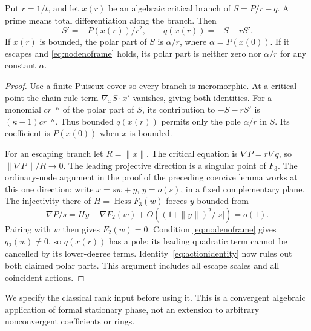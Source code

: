 \begin{lemma}\label{lem:actionidentity}
Put $r=1/t$, and let $x(r)$ be an algebraic critical branch of
$S=P/r-q$. A prime means total differentiation along the branch.
Then
\begin{equation}\label{eq:actionidentity}
 S'=-P(x(r))/r^2,\qquad q(x(r))=-S-rS'.
\end{equation}
If $x(r)$ is bounded, the polar part of $S$ is $\alpha/r$, where
$\alpha=P(x(0))$. If it escapes and \eqref{eq:nodenoframe} holds,
its polar part is neither zero nor $\alpha/r$ for any constant
$\alpha$.
\end{lemma}
\begin{proof}
Use a finite Puiseux cover so every branch is meromorphic. At a
critical point the chain-rule term $\nabla_x S\cdot x'$ vanishes,
giving both identities. For a monomial $c r^{-\kappa}$ of the
polar part of $S$, its contribution to $-S-rS'$ is
$(\kappa-1)c r^{-\kappa}$. Thus bounded $q(x(r))$ permits only
the pole $\alpha/r$ in $S$. Its coefficient is $P(x(0))$ when
$x$ is bounded.

For an escaping branch let $R=\|x\|$. The critical equation is
$\nabla P=r\nabla q$, so $\|\nabla P\|/R\longrightarrow0$.
The leading projective direction is a singular point of $F_3$.
The ordinary-node argument in the proof of the preceding coercive
lemma works at this one direction: write $x=sw+y$, $y=o(s)$,
in a fixed complementary plane. The injectivity there of
$H=\operatorname{Hess}F_3(w)$ forces $y$ bounded from
\[
 \nabla P/s=Hy+\nabla F_2(w)+O((1+\|y\|)^2/|s|)=o(1).
\]
Pairing with $w$ then gives $F_2(w)=0$. Condition
\eqref{eq:nodenoframe} gives $q_2(w)\ne0$, so $q(x(r))$ has a
pole: its leading quadratic term cannot be cancelled by its
lower-degree terms. Identity~\eqref{eq:actionidentity} now rules
out both claimed polar parts. This argument includes all escape
scales and all coincident actions.
\end{proof}

We specify the classical rank input before using it. This is a
convergent algebraic application of formal stationary phase, not
an extension to arbitrary nonconvergent coefficients or rings.

